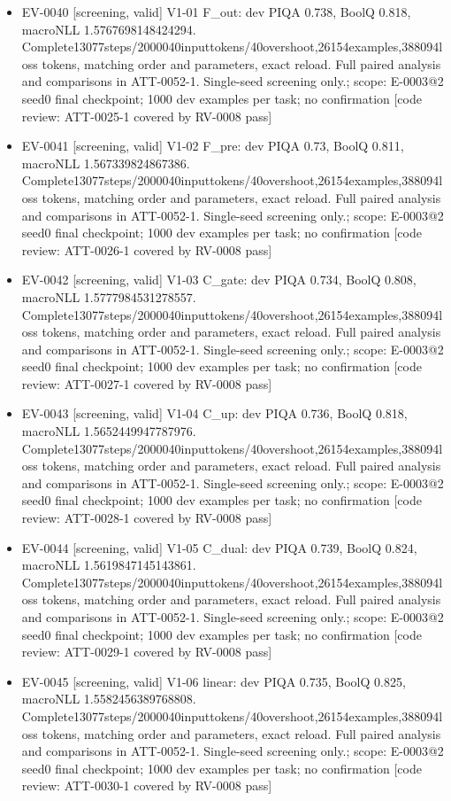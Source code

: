 \documentclass[11pt]{article}
\begin{document}
\begin{itemize}
\item EV-0040 [screening, valid] V1-01 F\_out: dev PIQA 0.738, BoolQ 0.818, macroNLL 1.5767698148424294. Complete13077steps/2000040inputtokens/40overshoot,26154examples,388094loss tokens, matching order and parameters, exact reload. Full paired analysis and comparisons in ATT-0052-1. Single-seed screening only.; scope: E-0003@2 seed0 final checkpoint; 1000 dev examples per task; no confirmation [code review: ATT-0025-1 covered by RV-0008 pass]
\item EV-0041 [screening, valid] V1-02 F\_pre: dev PIQA 0.73, BoolQ 0.811, macroNLL 1.567339824867386. Complete13077steps/2000040inputtokens/40overshoot,26154examples,388094loss tokens, matching order and parameters, exact reload. Full paired analysis and comparisons in ATT-0052-1. Single-seed screening only.; scope: E-0003@2 seed0 final checkpoint; 1000 dev examples per task; no confirmation [code review: ATT-0026-1 covered by RV-0008 pass]
\item EV-0042 [screening, valid] V1-03 C\_gate: dev PIQA 0.734, BoolQ 0.808, macroNLL 1.5777984531278557. Complete13077steps/2000040inputtokens/40overshoot,26154examples,388094loss tokens, matching order and parameters, exact reload. Full paired analysis and comparisons in ATT-0052-1. Single-seed screening only.; scope: E-0003@2 seed0 final checkpoint; 1000 dev examples per task; no confirmation [code review: ATT-0027-1 covered by RV-0008 pass]
\item EV-0043 [screening, valid] V1-04 C\_up: dev PIQA 0.736, BoolQ 0.818, macroNLL 1.5652449947787976. Complete13077steps/2000040inputtokens/40overshoot,26154examples,388094loss tokens, matching order and parameters, exact reload. Full paired analysis and comparisons in ATT-0052-1. Single-seed screening only.; scope: E-0003@2 seed0 final checkpoint; 1000 dev examples per task; no confirmation [code review: ATT-0028-1 covered by RV-0008 pass]
\item EV-0044 [screening, valid] V1-05 C\_dual: dev PIQA 0.739, BoolQ 0.824, macroNLL 1.5619847145143861. Complete13077steps/2000040inputtokens/40overshoot,26154examples,388094loss tokens, matching order and parameters, exact reload. Full paired analysis and comparisons in ATT-0052-1. Single-seed screening only.; scope: E-0003@2 seed0 final checkpoint; 1000 dev examples per task; no confirmation [code review: ATT-0029-1 covered by RV-0008 pass]
\item EV-0045 [screening, valid] V1-06 linear: dev PIQA 0.735, BoolQ 0.825, macroNLL 1.5582456389768808. Complete13077steps/2000040inputtokens/40overshoot,26154examples,388094loss tokens, matching order and parameters, exact reload. Full paired analysis and comparisons in ATT-0052-1. Single-seed screening only.; scope: E-0003@2 seed0 final checkpoint; 1000 dev examples per task; no confirmation [code review: ATT-0030-1 covered by RV-0008 pass]

\end{itemize}
\end{document}
